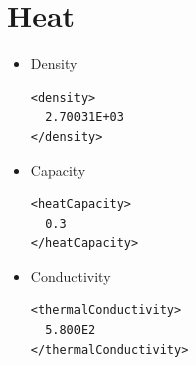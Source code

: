 \section{Heat}
\begin{itemize}
\item Density
\begin{verbatim}
<density>
  2.70031E+03
</density>
\end{verbatim}

\item Capacity
\begin{verbatim}
<heatCapacity>
  0.3
</heatCapacity>
\end{verbatim}

\item Conductivity
\begin{verbatim}
<thermalConductivity>
  5.800E2
</thermalConductivity>
\end{verbatim}


\end{itemize}


